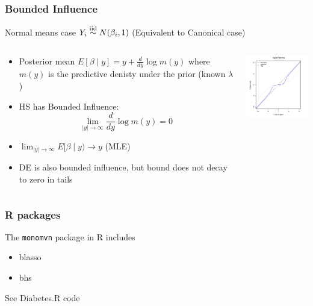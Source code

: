 \documentclass[handout]{beamer}
\begin{document}
\begin{frame}
  \frametitle{Bounded Influence}
Normal means case      $Y_i \mathrel{\mathop{\sim}\limits^{\rm iid}} N(\beta_i, 1)$    (Equivalent to Canonical case)
    \begin{columns}
    \begin{column}{.48\textwidth}
      \begin{itemize}
      \item 
Posterior mean
$E[\beta \mid y] = y + \frac{d} {d y} \log m(y)$
where $m(y)$ is the predictive denisty under the prior (known $\lambda$) \pause
\item HS has Bounded Influence: $$\lim_{|y| \to \infty} \frac{d}{dy} \log m(y) = 0$$ \pause
\item $\lim_{|y| \to \infty} E[\beta \mid y) \to y $ (MLE)\pause
\item DE is also bounded influence, but bound does not decay to zero in tails
      \end{itemize}

    \end{column}
    \begin{column}{.48\textwidth}
   \includegraphics[width=2in]{shrinkage}
    \end{column}
      
    \end{columns}
\end{frame}

\begin{frame}
  \frametitle{R packages}
  The {\tt monomvn} package in R includes
  \begin{itemize}
  \item blasso
  \item bhs
  \end{itemize}

See Diabetes.R code 


  
\end{frame}
\end{document}
